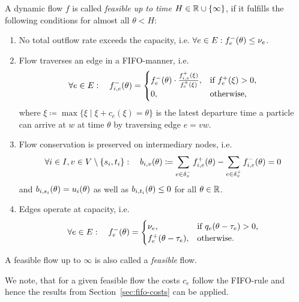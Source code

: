 \begin{definition}\label{def:feasible-flow}
    A dynamic flow $f$ is called \emph{feasible up to time $H\in\mathbb{R} \cup \{\infty \}$}, if it fulfills the following conditions for almost all $\theta < H$:
    \begin{enumerate}[label=(F\arabic*)]
        \item\label{def:feasible-flow:max-capacity} No total outflow rate exceeds the capacity, i.e. $\forall e\in E: {f}^-_e(\theta)\leq \nu_e$.
        \item\label{def:feasible-flow:deterministic-split} Flow traverses an edge in a FIFO-manner, i.e. \[
            \forall e\in E: \quad 
            {f}^-_{i,e}(\theta) = \begin{cases}
                {f}^-_e(\theta) \cdot \frac{{f}^+_{i,e}(\xi)}{{f}^+_e(\xi)}, & \text{if ${f}^+_e(\xi) > 0$,}\\
                0, & \text{otherwise,}
        \end{cases}
        \]
        where $\xi\coloneqq \max \{ \xi  \mid \xi + c_e(\xi) = \theta \}$ is the latest departure time a particle can arrive at $w$ at time $\theta$ by traversing edge $e=vw$. 
        \item\label{def:feasible-flow:flow-conservation} Flow conservation is preserved on intermediary nodes, i.e. \[\forall i\in I, v\in V\setminus\{ s_i, t_i \}: \quad
        b_{i,v}(\theta)\coloneqq \sum_{e\in\delta^-_{v}}{f}^+_{i,e}(\theta) - \sum_{e\in\delta^+_{v}} {f}^-_{i,e}(\theta) = 0 \]
        and $b_{i,s_i}(\theta) = u_i(\theta)$ as well as $b_{i,t_i}(\theta) \leq 0$ for all $\theta\in\mathbb{R}$.

        \item\label{def:feasible-flow:operate-at-capacity} Edges operate at capacity, i.e. 
        \[
            \forall e\in E: \quad {f}^-_{e}(\theta) = \begin{cases}
                \nu_e, &\text{if $q_e(\theta - \tau_e)>0$,} \\
                {f}^+_e(\theta-\tau_e), &\text{otherwise.}
            \end{cases}
        \]
    \end{enumerate}
    A feasible flow up to $\infty$ is also called a \emph{feasible} flow.
\end{definition}

We note, that for a given feasible flow the costs $c_e$ follow the FIFO-rule and hence the results from Section~\ref{sec:fifo-costs} can be applied.

